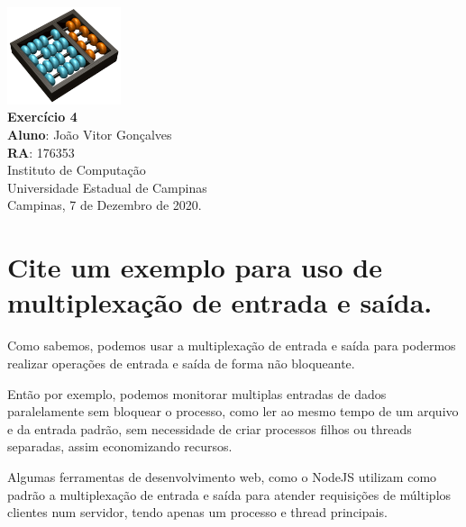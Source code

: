 \documentclass[12pt,a4paper]{report}
\begin{document}
\begin{titlepage}
        \begin{center}
                \vspace*{1cm}
                \includegraphics[width=0.25\textwidth]{Logo}\\
                \vspace{1.5cm}
                \Huge
                \textbf{Exercício 4}\\
                \vspace{1.5cm}
                \Large
                \textbf{Aluno}: João Vitor Gonçalves\\
                \textbf{RA}: 176353\\
                \vspace{1.2cm}
                \Large
                Instituto de Computação\\
                Universidade Estadual de Campinas\\
                \vspace{1.5cm}
                Campinas, 7 de Dezembro de 2020.
        \end{center}
\end{titlepage}
\tableofcontents
\clearpage

\newcommand{\shellcmd}[1]{\texttt{\footnotesize\# #1}}%

\section{Cite um exemplo para uso de multiplexação de entrada e saída.}
Como sabemos, podemos usar a multiplexação de entrada e saída para podermos realizar operações de entrada e saída de forma não bloqueante.

Então por exemplo, podemos monitorar multiplas entradas de dados paralelamente sem bloquear o processo, como ler ao mesmo tempo de um arquivo e da entrada padrão, sem necessidade de criar processos filhos ou threads separadas, assim economizando recursos.

Algumas ferramentas de desenvolvimento web, como o NodeJS utilizam como padrão a multiplexação de entrada e saída para atender requisições de múltiplos clientes num servidor, tendo apenas um processo e thread principais.
\end{document}

